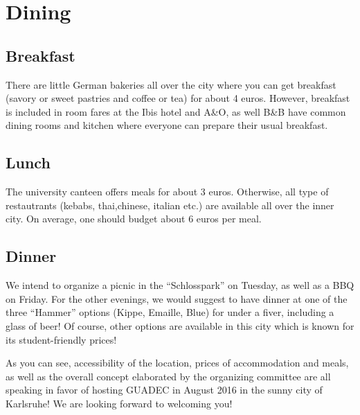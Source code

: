 \section{Dining}

\subsection{Breakfast}
There are little German bakeries all over the city where you can get breakfast (savory or sweet pastries and coffee or tea) for about 4 euros. However, breakfast is included in room fares at the Ibis hotel and A\&O, as well B\&B have common dining rooms and kitchen where everyone can prepare their usual breakfast.
 
\subsection{Lunch}
The university canteen offers meals for about 3 euros. Otherwise, all type of restautrants (kebabs, thai,chinese, italian etc.) are available all over the inner city. On average, one should budget about 6 euros per meal.


\subsection{Dinner}
We intend to organize a picnic in the “Schlosspark” on Tuesday, as well as a BBQ on Friday. For the other evenings, we would suggest to have dinner at one of the three “Hammer” options (Kippe, Emaille, Blue) for under a fiver, including a glass of beer! Of course, other options are available in this city which is known for its student-friendly prices!


As you can see, accessibility of the location, prices of accommodation and meals, as well as the overall concept elaborated by the organizing committee are all speaking in favor of hosting GUADEC in August 2016 in the sunny city of Karlsruhe! We are looking forward to welcoming you!

